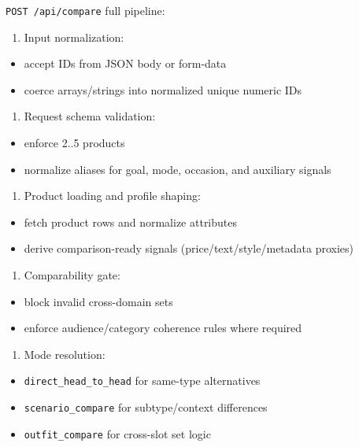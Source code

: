 \documentclass[12pt,a4paper]{report}
\begin{document}
\texttt{POST /api/compare} full pipeline:

\begin{enumerate}
\item Input normalization:
\end{enumerate}
\begin{itemize}
\item accept IDs from JSON body or form-data
\item coerce arrays/strings into normalized unique numeric IDs
\end{itemize}
\begin{enumerate}
\item Request schema validation:
\end{enumerate}
\begin{itemize}
\item enforce 2..5 products
\item normalize aliases for goal, mode, occasion, and auxiliary signals
\end{itemize}
\begin{enumerate}
\item Product loading and profile shaping:
\end{enumerate}
\begin{itemize}
\item fetch product rows and normalize attributes
\item derive comparison-ready signals (price/text/style/metadata proxies)
\end{itemize}
\begin{enumerate}
\item Comparability gate:
\end{enumerate}
\begin{itemize}
\item block invalid cross-domain sets
\item enforce audience/category coherence rules where required
\end{itemize}
\begin{enumerate}
\item Mode resolution:
\end{enumerate}
\begin{itemize}
\item \texttt{direct\_head\_to\_head} for same-type alternatives
\item \texttt{scenario\_compare} for subtype/context differences
\item \texttt{outfit\_compare} for cross-slot set logic
\end{itemize}
\end{document}
